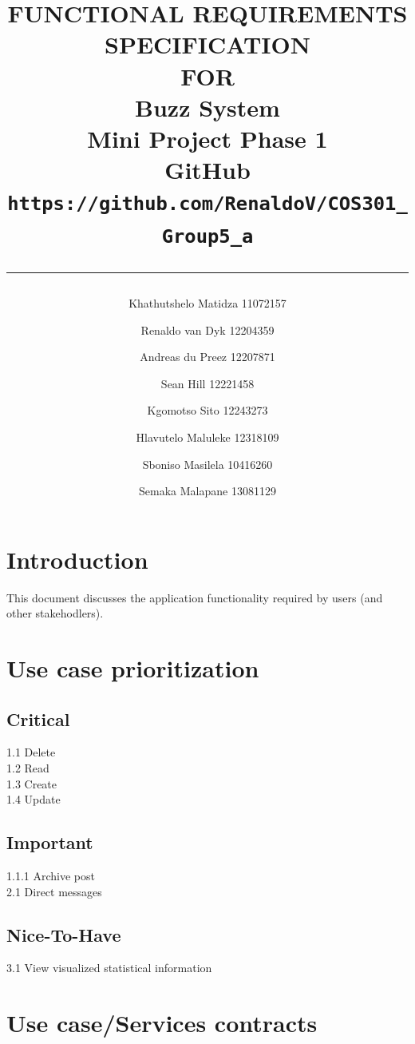 \documentclass{scrreprt}
\title{%
\author{
Khathutshelo Matidza 11072157\\
\and
Renaldo van Dyk 12204359\\
\and
Andreas du Preez 12207871\\
\and
Sean Hill 12221458\\
\and
Kgomotso Sito 12243273\\
\and
Hlavutelo Maluleke 12318109\\
\and
Sboniso Masilela 10416260\\
\and
Semaka Malapane 13081129\\
}
\centering
\Huge{FUNCTIONAL REQUIREMENTS\\ SPECIFICATION}\\
\vspace{2cm}
FOR\\
\vspace{2cm}
Buzz System\\
\vspace{2cm}
Mini Project Phase 1\\
GitHub\\
\LARGE\texttt{https://github.com/RenaldoV/COS301\_Group5\_a}
\vfill
\vspace{1cm}
\rule{15cm}{3pt}
}
\date{}
\begin{document}
\maketitle
\tableofcontents
\chapter{ Introduction}
This document discusses the application functionality required by users (and other stakehodlers).\\
\chapter{ Use case prioritization}
\section{Critical}
1.1 Delete\\
1.2 Read\\
1.3 Create\\
1.4 Update\\
\section{Important}
1.1.1 Archive post\\
2.1 Direct messages\\
\section{Nice-To-Have}
3.1 View visualized statistical information\\
\chapter{Use case/Services contracts}
\end{document}
